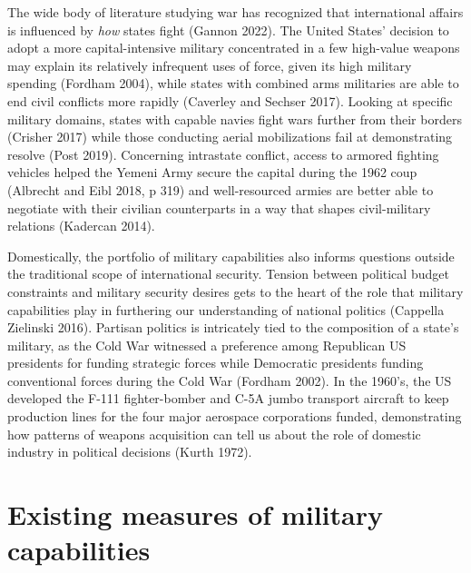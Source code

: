 \documentclass[
]{article}
\begin{document}
The wide body of literature studying war has recognized that international affairs is influenced by \emph{how} states fight (Gannon 2022). The United States' decision to adopt a more capital-intensive military concentrated in a few high-value weapons may explain its relatively infrequent uses of force, given its high military spending (Fordham 2004), while states with combined arms militaries are able to end civil conflicts more rapidly (Caverley and Sechser 2017). Looking at specific military domains, states with capable navies fight wars further from their borders (Crisher 2017) while those conducting aerial mobilizations fail at demonstrating resolve (Post 2019). Concerning intrastate conflict, access to armored fighting vehicles helped the Yemeni Army secure the capital during the 1962 coup (Albrecht and Eibl 2018, p 319) and well-resourced armies are better able to negotiate with their civilian counterparts in a way that shapes civil-military relations (Kadercan 2014).

Domestically, the portfolio of military capabilities also informs questions outside the traditional scope of international security. Tension between political budget constraints and military security desires gets to the heart of the role that military capabilities play in furthering our understanding of national politics (Cappella Zielinski 2016). Partisan politics is intricately tied to the composition of a state's military, as the Cold War witnessed a preference among Republican US presidents for funding strategic forces while Democratic presidents funding conventional forces during the Cold War (Fordham 2002). In the 1960's, the US developed the F-111 fighter-bomber and C-5A jumbo transport aircraft to keep production lines for the four major aerospace corporations funded, demonstrating how patterns of weapons acquisition can tell us about the role of domestic industry in political decisions (Kurth 1972).

\hypertarget{existing-measures-of-military-capabilities}{%
\section{Existing measures of military capabilities}\label{existing-measures-of-military-capabilities}}
\end{document}
